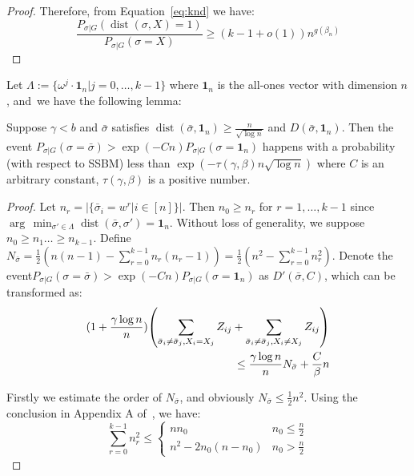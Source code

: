 \documentclass[entropy,article,accept,moreauthors,pdftex]{Definitions/mdpi}
\newcommand{\1}{\mathbbm{1}}
\DeclareMathOperator{\Dist}{dist}
\begin{document}
\begin{paracol}{2}
\begin{proof}
Therefore, from Equation~\eqref{eq:knd} we have:
\begin{equation*}
	\frac{P_{\sigma|G}(\Dist(\sigma, X)=1)}
{P_{\sigma|G}(\sigma=X)} \geq (k-1+o(1)) n^{g(\beta_n)}
\end{equation*}
\end{proof}

Let $\Lambda := \{ \omega^j  \cdot \mathbf{1}_n | j=0, \dots,k-1\}$
where $\mathbf{1}_n$ is the all-ones vector %
 with dimension $n$, and~we have the following lemma:
\begin{Lemma}\label{lem:small}
	Suppose $\gamma < b $ and $\bar{\sigma}$ satisfies $\Dist(\bar{\sigma}, \mathbf{1}_n) \geq \frac{n}{\sqrt{\log  n}}$
	and $D(\bar{\sigma}, \mathbf{1}_n)$.
	Then the event
	$P_{\sigma | G}(\sigma = \bar{\sigma} ) > \exp(-Cn) P_{\sigma | G}(\sigma = \mathbf{1}_n)$
	happens with a probability (with respect to SSBM) less than $\exp(-\tau(\gamma,\beta) n \sqrt{\log  n} )$ where $C$ is an arbitrary constant, $\tau(\gamma,\beta)$ is a positive number.
\end{Lemma}
\begin{proof}
	Let $n_r = |\{\bar{\sigma}_i = w^r | i\in [n] \}|$. Then $n_0 \geq n_r$ for $r=1, \dots, k-1$ since\linebreak $\arg\,\min_{\sigma'\in \Lambda} \Dist(\bar{\sigma}, \sigma') = \mathbf{1}_n$.
	Without loss of generality,
	we suppose \mbox{$n_0 \geq n_1 \dots \geq n_{k-1}$}.
	Define $N_{\bar{\sigma}} = \frac{1}{2}(n(n-1) - \sum_{r=0}^{k-1} n_r(n_r-1))
	=\frac{1}{2}(n^2 - \sum_{r=0}^{k-1} n_r^2)$.
	Denote the event\linebreak $P_{\sigma | G}(\sigma = \bar{\sigma} ) > \exp(-Cn) P_{\sigma | G}(\sigma = \mathbf{1}_n)$ as $D'(\bar{\sigma}, C)$,
	which can be transformed as:
\begin{align}
	(1 + \frac{\gamma \log n}{n})
	\left( \sum_{\bar{\sigma}_i  \neq \bar{\sigma}_j, X_i = X_j} Z_{ij} +
	\sum_{\bar{\sigma}_i  \neq \bar{\sigma}_j, X_i \neq X_j} Z_{ij} \right)\notag\\
	\leq \frac{\gamma \log n}{n} N_{\bar{\sigma}} + \frac{C}{\beta} n\label{eq:small}
	\end{align}
		
	Firstly we estimate the order of $N_{\bar{\sigma}}$, and obviously $N_{\bar{\sigma}} \leq \frac{1}{2} n^2$.
	Using the conclusion in Appendix A of~\cite{chen2016information}, we have:
\begin{equation}
	\sum_{r=0}^{k-1} n_r^2 \leq
	\begin{cases}
	n n_0 & n_0 \leq \frac{n}{2} \\
	n^2 - 2n_0(n-n_0) & n_0 > \frac{n}{2}
	\end{cases}
	\end{equation}
	

\end{proof}
\end{paracol}
\end{document}
